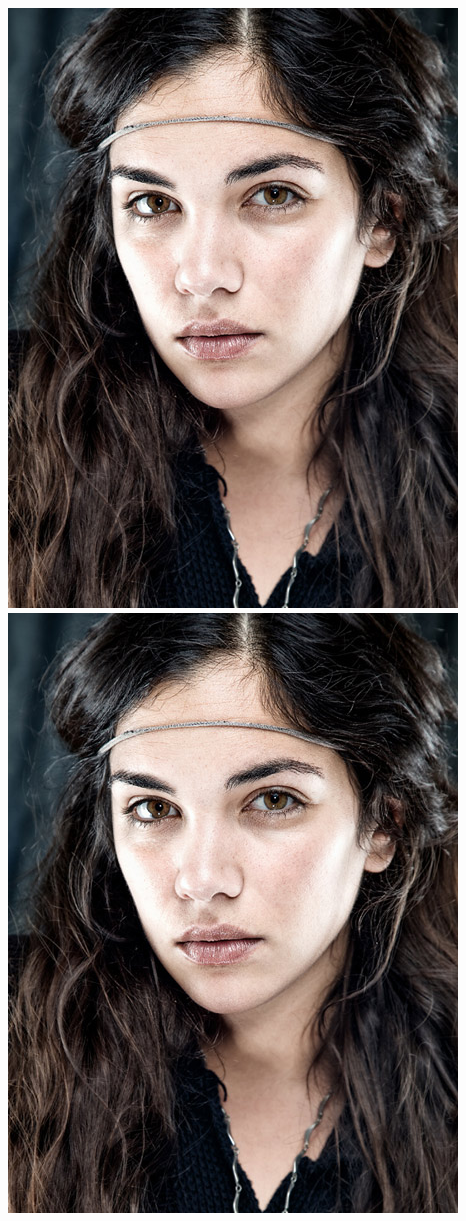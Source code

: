 \documentclass{article}
\begin{document}
\includegraphics[scale=0.2,scale=0.5,angle=10]{./images/amato}
\includegraphics[scale=0.2,scale=0.5,angle=0]{./images/amato}
\end{document}
